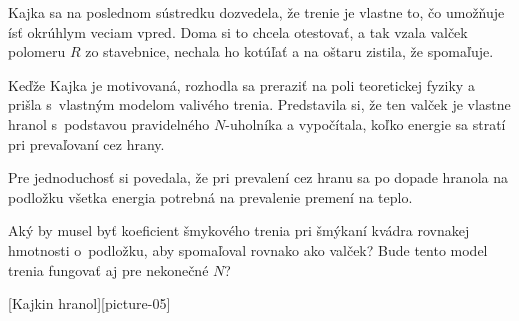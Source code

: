 Kajka sa na poslednom sústredku dozvedela, že trenie je vlastne to, čo
umožňuje ísť okrúhlym veciam vpred. Doma si to chcela otestovať, a tak
vzala valček polomeru $R$ zo stavebnice, nechala ho kotúľať a na oštaru
zistila, že spomaľuje.

Keďže Kajka je motivovaná, rozhodla sa preraziť na poli teoretickej
fyziky a prišla s~vlastným modelom valivého trenia. Predstavila si, že
ten valček je vlastne hranol s~podstavou pravidelného $N$-uholníka a
vypočítala, koľko energie sa stratí pri prevaľovaní cez hrany.

Pre jednoduchosť si povedala, že pri prevalení cez hranu sa po dopade
hranola na podložku všetka energia potrebná na prevalenie premení na
teplo.

Aký by musel byť koeficient šmykového trenia pri šmýkaní kvádra rovnakej
hmotnosti o~podložku, aby spomaľoval rovnako ako valček? Bude tento
model trenia fungovať aj pre nekonečné $N$?

[Kajkin hranol][picture-05]
